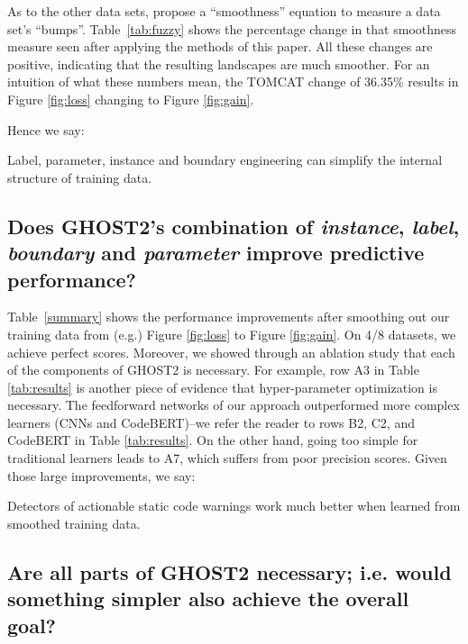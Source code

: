  As to the other data
      sets,
      \citet{li2018visualizing}
      propose a ``smoothness'' equation
      to measure a data set's
      ``bumps''.
      Table~\ref{tab:fuzzy}
      shows the percentage 
      change in that smoothness
      measure seen   after applying the methods of this paper. 
       All these changes
    are positive, indicating that the resulting landscapes are much smoother.
    For an intuition of what these numbers mean,    the TOMCAT change of 36.35\% results in Figure \ref{fig:loss}  
    changing to Figure \ref{fig:gain}.
    
    Hence we say:
    
    
\begin{formal}
 Label, parameter, instance and boundary engineering can simplify the
internal structure of   training
data.
\end{formal}





\subsection*{
  Does  GHOST2's  combination of {\em instance}, {\em label}, {\em boundary}  and {\em parameter}  improve predictive performance?} 
     
   
 Table~\ref{summary} shows the performance
 improvements   after
 smoothing out our training
 data from (e.g.)
 Figure \ref{fig:loss} to 
 Figure \ref{fig:gain}. On 4/8 datasets, we achieve perfect scores. Moreover, we showed through an ablation study that each of the components of GHOST2 is necessary. For example, row A3 in Table \ref{tab:results} is another piece of evidence that hyper-parameter optimization is necessary. The feedforward networks of our approach outperformed more complex learners (CNNs and CodeBERT)--we refer the reader to rows B2, C2, and CodeBERT in Table \ref{tab:results}. On the other hand, going too simple for traditional learners leads to A7, which suffers from poor precision scores.
 Given those large improvements, we say: 
 
\begin{formal}
Detectors of actionable 
 static code warnings  work much better 
 when learned from smoothed
 training data.
 \end{formal}
 
 


\subsection*{  
  Are all parts of GHOST2 necessary; i.e. would
something simpler also achieve the overall goal?}


